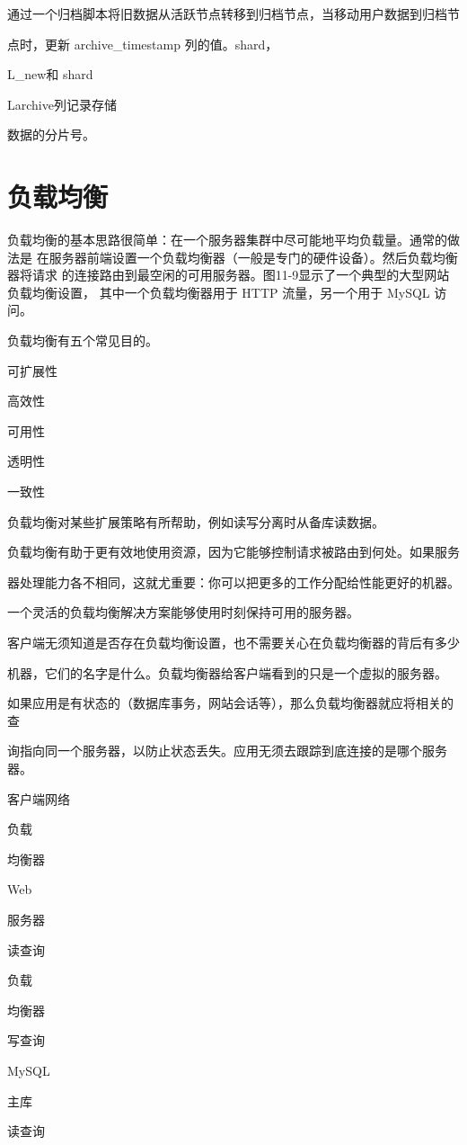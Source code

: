 通过一个归档脚本将旧数据从活跃节点转移到归档节点，当移动用户数据到归档节

点时，更新 archive\_timestamp 列的值。shard，

L\_new和 shard

Larchive列记录存储

数据的分片号。

\section{负载均衡}
负载均衡的基本思路很简单：在一个服务器集群中尽可能地平均负载量。通常的做法是
在服务器前端设置一个负载均衡器（一般是专门的硬件设备）。然后负载均衡器将请求
的连接路由到最空闲的可用服务器。图11-9显示了一个典型的大型网站负载均衡设置，
其中一个负载均衡器用于 HTTP 流量，另一个用于 MySQL 访问。

负载均衡有五个常见目的。

可扩展性

高效性

可用性

透明性

一致性

负载均衡对某些扩展策略有所帮助，例如读写分离时从备库读数据。

负载均衡有助于更有效地使用资源，因为它能够控制请求被路由到何处。如果服务

器处理能力各不相同，这就尤重要：你可以把更多的工作分配给性能更好的机器。

一个灵活的负载均衡解决方案能够使用时刻保持可用的服务器。

客户端无须知道是否存在负载均衡设置，也不需要关心在负载均衡器的背后有多少

机器，它们的名字是什么。负载均衡器给客户端看到的只是一个虚拟的服务器。

如果应用是有状态的（数据库事务，网站会话等），那么负载均衡器就应将相关的查

询指向同一个服务器，以防止状态丢失。应用无须去跟踪到底连接的是哪个服务器。

客户端网络

负载

均衡器

Web

服务器

读查询

负载

均衡器

写查询

MySQL

主库

读查询

